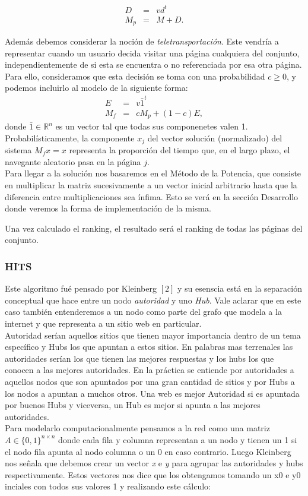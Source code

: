 \begin{eqnarray*}
D & = & v d^t \\
M_p & = & M + D.
\end{eqnarray*}
 

Además debemos considerar la noción de \emph{teletransportación}. Este vendría a representar cuando un usuario  decida visitar
una p\'agina cualquiera del conjunto, independientemente de si esta se encuentra o no referenciada por esa otra página. Para ello, consideramos que esta decisi\'on se toma con una probabilidad
$c \ge 0$, y podemos incluirlo al modelo de la siguiente forma:
\begin{eqnarray*}
E & = & v \bar{1}^t \\
M_f & = & cM_p + (1-c)E,
\end{eqnarray*}
\noindent donde $\bar{1} \in \mathbb{R}^n$ es un vector tal que todas sus componenetes valen 1. Probabil\'isticamente, la
componente $x_j$ del vector soluci\'on (normalizado) del sistema $M_f x = x$ representa la proporci\'on del tiempo que,
en el largo plazo, el navegante aleatorio pasa en la p\'agina $j$. \\
Para llegar a la solución nos basaremos en el Método de la Potencia, que consiste en multiplicar la matriz sucesivamente a un vector inicial arbitrario hasta que la diferencia entre multiplicaciones sea ínfima. Esto se verá en la sección Desarrollo donde veremos la forma de implementación de la misma.


Una vez calculado el ranking, el resultado será el ranking de todas las páginas del conjunto.


\subsubsection{HITS}

Este algoritmo fué pensado por Kleinberg $[2]$ y su esenscia está en la separación conceptual que hace entre un nodo \textit{autoridad} y uno \textit{Hub}. Vale aclarar que en este caso también entenderemos a un nodo como parte del grafo que modela a la internet y que representa a un sitio web en particular. \\
Autoridad serían aquellos sitios que tienen mayor importancia dentro de un tema específico y Hubs los que apuntan a estos sitios. En palabras mas terrenales las autoridades serían los que tienen las mejores respuestas y los hubs los que conocen a las mejores autoridades.
En la práctica se entiende por autoridades a aquellos nodos que son apuntados por una gran cantidad de sitios y por Hubs a los nodos a apuntan a muchos otros. Una web es mejor Autoridad si es apuntada por buenos Hubs y viceversa, un Hub es mejor si apunta a las mejores autoridades.\\
Para modelarlo computacionalmente pensamos a la red como una matriz $A \in \{0,1\}^{n \times n}$ donde cada fila y columna representan a un nodo y tienen un 1 si el nodo fila apunta al nodo columna o un 0 en caso contrario. Luego Kleinberg nos señala que debemos crear un vector \textit{x} e \textit{y} para agrupar las autoridades y hubs respectivamente. Estos vectores nos dice que los obtengamos tomando un x0 e y0 inciales con todos sus valores 1 y realizando este cálculo:


